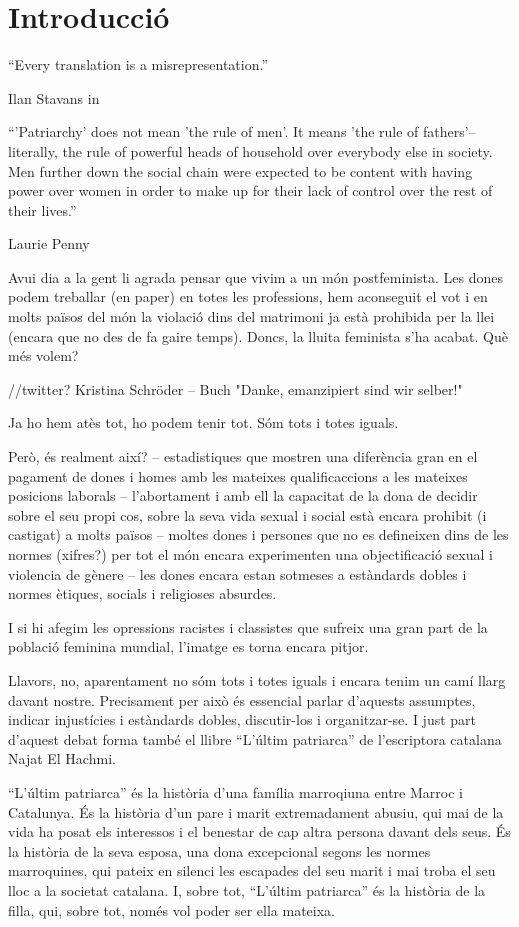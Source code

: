 \section{Introducció}

\epigraph{``Every translation is a misrepresentation.''}{Ilan Stavans in~\autocite{Albin2005}}
\epigraph{``'Patriarchy' does not mean 'the rule of men'. It means 'the rule of fathers'--literally, the rule of powerful heads of household over everybody else in society. Men further down the social chain were expected to be content with having power over women in order to make up for their lack of control over the rest of their lives.''}{Laurie Penny~\autocite[69]{Penny2014}}

Avui dia a la gent li agrada pensar que vivim a un món postfeminista.
Les dones podem treballar (en paper) en totes les professions, hem aconseguit el vot i en molts països del món la violació dins del matrimoni ja està prohibida per la llei (encara que no des de fa gaire temps).
Doncs, la lluita feminista s'ha acabat.
Què més volem?

//twitter?
Kristina Schröder --  Buch "Danke, emanzipiert sind wir selber!"

Ja ho hem atès tot, ho podem tenir tot.
Sóm tots i totes iguals.

Però, és realment així?
-- estadistiques que mostren una diferència gran en el pagament de dones i homes amb les mateixes qualificaccions a les mateixes posicions laborals
-- l'abortament i amb ell la capacitat de la dona de decidir sobre el seu propi cos, sobre la seva vida sexual i social està encara prohibit (i castigat) a molts països
-- moltes dones i persones que no es defineixen dins de les normes (xifres?) per tot el món encara experimenten una objectificació sexual i violencia de gènere
-- les dones encara estan sotmeses a estàndards dobles i normes ètiques, socials i religioses absurdes.

I si hi afegim les opressions racistes i classistes que sufreix una gran part de la població feminina mundial, l'imatge es torna encara pitjor.

Llavors, no, aparentament no sóm tots i totes iguals i encara tenim un camí llarg davant nostre.
Precisament per això és essencial parlar d'aquests assumptes, indicar injustícies i estàndards dobles, discutir-los i organitzar-se.
I just part d'aquest debat forma també el llibre ``L'últim patriarca'' de l'escriptora catalana Najat El Hachmi.

``L'últim patriarca'' és la història d'una família marroqiuna entre Marroc i Catalunya.
És la història d'un pare i marit extremadament abusiu, qui mai de la vida ha posat els interessos i el benestar de cap altra persona davant dels seus.
És la història de la seva esposa, una dona excepcional segons les normes marroquines, qui pateix en silenci les escapades del seu marit i mai troba el seu lloc a la societat catalana.
I, sobre tot, ``L'últim patriarca'' és la història de la filla, qui, sobre tot, només vol poder ser ella mateixa.

